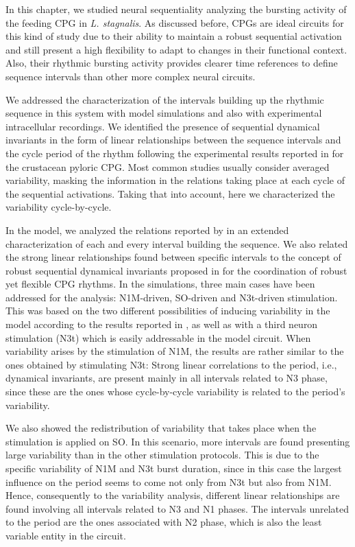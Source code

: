 In this chapter, we studied neural sequentiality analyzing the bursting activity of the feeding CPG in \textit{L. stagnalis}. As discussed before, CPGs are ideal circuits for this kind of study due to their ability to maintain a robust sequential activation and still present a high flexibility to adapt to changes in their functional context. Also, their rhythmic bursting activity provides clearer time references to define sequence intervals than other more complex neural  circuits. 

We addressed the characterization of the intervals building up the rhythmic sequence in this system with model simulations and also with experimental intracellular recordings. We identified the presence of sequential dynamical invariants in the form of linear relationships between the sequence intervals and the cycle period of the rhythm following the experimental results reported in \textcite{elices_robust_2019} for the crustacean pyloric CPG. Most common studies usually consider averaged variability, masking the information in the relations taking place at each cycle of the sequential activations. Taking that into account, here we characterized the variability cycle-by-cycle. 

In the model, we analyzed the relations reported by \textcite{elliott_temporal_1991} in an extended characterization of each and every interval building the sequence. We also related the strong linear relationships found between specific intervals to the concept of robust sequential dynamical invariants proposed in \textcite{elices_robust_2019} for the coordination of robust yet flexible CPG rhythms. In the simulations, three main cases have been addressed for the analysis: N1M-driven, SO-driven and N3t-driven stimulation. This was based on the two different possibilities of inducing variability in the model according to the results reported in \textcite{vavoulis_dynamic_2007}, as well as with a third neuron stimulation (N3t) which is easily addressable in the model circuit. When variability arises by the stimulation of N1M, the results are rather similar to the ones obtained by stimulating N3t: Strong linear correlations to the period, i.e., dynamical invariants, are present mainly in all intervals related to N3 phase, since these are the ones whose cycle-by-cycle variability is related to the period's variability.  

We also showed the redistribution of variability that takes place when the stimulation is applied on SO. In this scenario, more intervals are found presenting large variability than in the other stimulation protocols. This is due to the specific variability of N1M and N3t burst duration, since in this case the largest influence on the period seems to come not only from N3t but also from N1M. Hence, consequently to the variability analysis, different linear relationships are found involving all intervals related to N3 and N1 phases. The intervals unrelated to the period are the ones associated with N2 phase, which is also the least variable entity in the circuit. 

